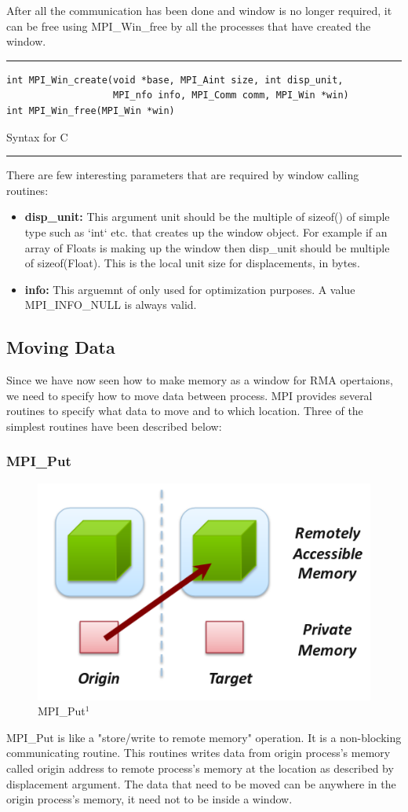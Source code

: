 After all the communication has been done and window is no longer required, it can be free using {\ttfamily MPI\_Win\_free} by all the 
processes that have created the window.\\
\hrule
\begin{listing}[!ht]
\begin{verbatim}
int MPI_Win_create(void *base, MPI_Aint size, int disp_unit,
                   MPI_nfo info, MPI_Comm comm, MPI_Win *win)
int MPI_Win_free(MPI_Win *win)
\end{verbatim}
\caption{Syntax for C}
\end{listing}
\hrule
\vspace{10pt}
There are few interesting parameters that are required by window calling routines:
\begin{itemize}
    \item \textbf{disp\_unit:} This argument unit should be the multiple of {\ttfamily sizeof()} of simple type such as `int` etc.
    that creates up the window object. For example if an array of {\ttfamily Floats} is making up the window then {\ttfamily disp\_unit}
    should be multiple of {\ttfamily sizeof(Float)}. This is the local unit size for displacements, in bytes.
    \item \textbf{info:} This arguemnt of only used for optimization purposes. A value {\ttfamily MPI\_INFO\_NULL} is always valid.
\end{itemize}

\subsection{Moving Data}
Since we have now seen how to make memory as a window for RMA opertaions, we need to specify how to move data between process.
MPI provides several routines to specify what data to move and to which location. Three of the simplest routines have been
described below:
\subsubsection{{\ttfamily \large MPI\_Put}}
\begin{figure}[!ht]
    \centering
    \includegraphics[width=0.35\linewidth]{attachments/put_rma.png}
    \caption{MPI\_Put$^1$}
\end{figure}
{\ttfamily MPI\_Put} is like a "store/write to remote memory" operation. It is a non-blocking communicating routine. This routines 
writes data from {\ttfamily origin} process's memory called {\ttfamily origin address} to {\ttfamily remote} process's memory at
the location as described by {\ttfamily displacement} argument. The data that need to be moved can be anywhere in the {\ttfamily origin}
process's memory, it need not to be inside a window.

